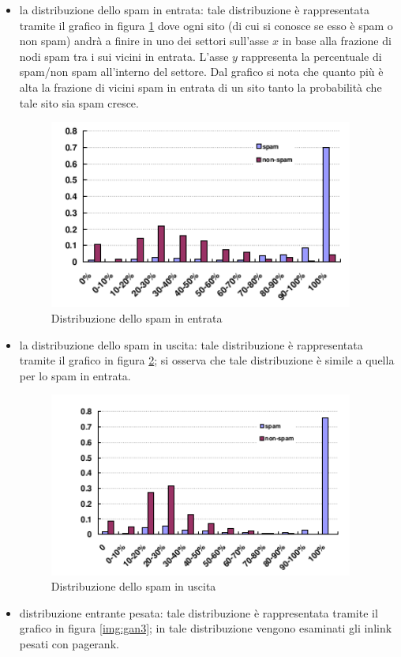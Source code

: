 \begin{itemize}
 \item la distribuzione dello spam in entrata: tale distribuzione è rappresentata  tramite il grafico in figura \ref{img:gan1}  dove ogni sito (di cui si conosce se esso è spam o non spam) andrà a finire in uno dei settori sull'asse \(x\) in base alla frazione di nodi spam tra i sui vicini in entrata. L'asse \(y\) rappresenta la percentuale di spam/non spam all'interno del settore. Dal grafico si nota che quanto più è alta la frazione di vicini spam in entrata di un sito tanto la probabilità che tale sito sia spam cresce.  
 \begin{figure}
 \centering
\includegraphics[width=10cm]{immagini/gan/immagine1.png}
\caption{Distribuzione dello spam in entrata}
\label{img:gan1}
\end{figure}
\item la distribuzione dello spam in uscita: tale distribuzione è rappresentata  tramite il grafico in figura \ref{img:gan2}; si osserva che tale distribuzione è simile a quella per lo spam in entrata.
 \begin{figure}
 \centering
\includegraphics[width=10cm]{immagini/gan/immagine2.png}
\caption{Distribuzione dello spam in uscita}
\label{img:gan2}
\end{figure}
\item distribuzione entrante pesata: tale distribuzione è rappresentata  tramite il grafico in figura \ref{img:gan3}; in tale distribuzione vengono esaminati gli inlink pesati con pagerank.

\end{itemize}
